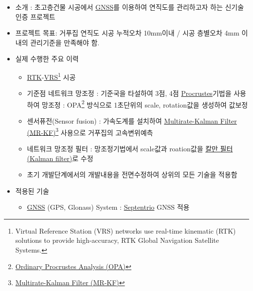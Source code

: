 \documentclass[10pt,a4paper,ragged2e]{altacv}
\begin{document}
\clearpage
\begin{fullwidth}


\begin{itemize}
\item 소개 : 초고층건물 시공에서 \href{http://gnss.ngii.go.kr/info/summary}{GNSS}를 이용하여 연직도를 관리하고자 하는 신기술 인증 프로젝트
\item 프로젝트 목표: 거푸집 연직도 시공 누적오차 10mm이내 / 시공 층별오차 4mm 이내의 관리기준을 만족해야 함.
\item 실제 수행한 주요 이력
\begin{itemize}
  \item \href{https://en.wikipedia.org/wiki/Real_Time_Kinematic}{RTK}-\href{https://en.wikipedia.org/wiki/Virtual_Reference_Station}{VRS}\footnote{Virtual Reference Station (VRS) networks use real-time kinematic (RTK) solutions to provide high-accuracy, RTK Global Navigation Satellite Systems.} 시공
  \item 기준점 네트워크 망조정 : 기준국을 타설하여 3점, 4점 \href{https://en.wikipedia.org/wiki/Procrustes_analysis}{Procrustes}기법을 사용하여 망조정 : OPA\footnote{\href{https://en.wikipedia.org/wiki/Procrustes_analysis}{Ordinary Procrustes Analysis (OPA)}} 방식으로 1초단위의 scale, rotation값을 생성하여 값보정 
  \item 센서퓨전(Sensor fusion) : 가속도계를 설치하여 \href{http://scholar.lib.vt.edu/theses/available/etd-062899-064821/unrestricted/etd.PDF}{Multirate-Kalman Filter (MR-KF)}\footnote{\href{http://scholar.lib.vt.edu/theses/available/etd-062899-064821/unrestricted/etd.PDF}{Multirate-Kalman Filter (MR-KF)}} 사용으로 거푸집의 고속변위예측 
  \item 네트워크 망조정 필터 : 망조정기법에서 scale값과 roation값을 \href{https://ko.wikipedia.org/wiki/\%EC\%B9\%BC\%EB\%A7\%8C_\%ED\%95\%84\%ED\%84\%B0}{칼만 필터(Kalman filter)}로 수정
  \item 초기 개발단계에서의 개발내용을 전면수정하여 상위의 모든 기술을 적용함
\end{itemize}
\item 적용된 기술
  \begin{itemize}
    \item \href{http://gnss.ngii.go.kr/info/summary}{GNSS} (GPS, Glonass) System : \href{http://www.septentrio.com/}{Septentrio} GNSS 적용 

\end{itemize}
\end{itemize}
\end{fullwidth}
\end{document}
